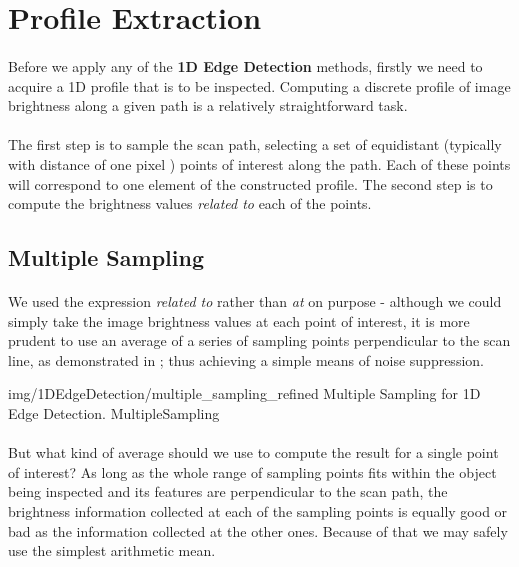 \section{Profile Extraction}

\paragraph*{}
Before we apply any of the \textbf{1D Edge Detection} methods, firstly we need to acquire a 1D profile that is to be inspected. Computing a discrete profile of image brightness along a given path is a relatively straightforward task.

\paragraph*{}
The first step is to sample the scan path, selecting a set of equidistant (typically with distance of one pixel \cite[p. 150]{MVTec08}) points of interest along the path. Each of these points will correspond to one element of the constructed profile. The second step is to compute the brightness values \textit{related to} each of the points.

\subsection{Multiple Sampling}
\paragraph*{}
We used the expression \textit{related to} rather than \textit{at} on purpose - although we could simply take the image brightness values at each point of interest, it is more prudent to use an average of a series of sampling points perpendicular to the scan line, as demonstrated in ; thus achieving a simple means of noise suppression. 

\oneFigure
{img/1DEdgeDetection/multiple_sampling_refined}
{Multiple Sampling for 1D Edge Detection.}
{MultipleSampling}
{\basicWidth}

\paragraph*{}
But what kind of average should we use to compute the result for a single point of interest? As long as the whole range of sampling points fits within the object being inspected and its features are perpendicular to the scan path, the brightness information collected at each of the sampling points is equally good or bad as the information collected at the other ones. Because of that we may safely use the simplest arithmetic mean.

